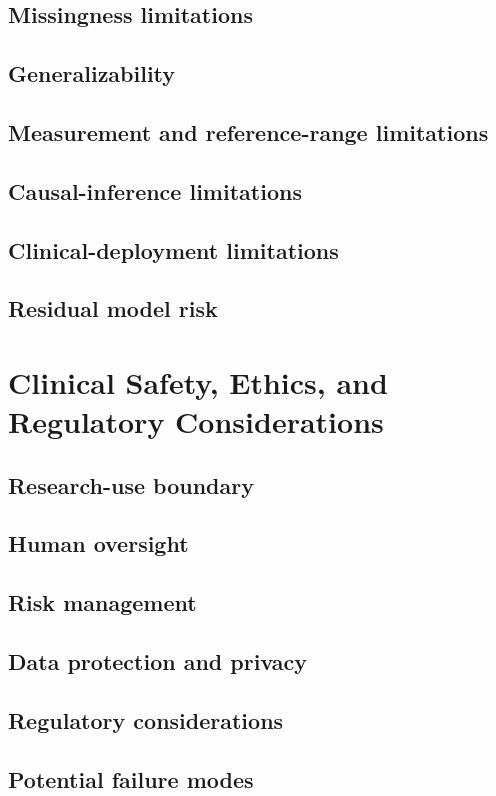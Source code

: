 \documentclass[10pt,journal]{IEEEtran}
\begin{document}
\subsection{Missingness limitations}
\subsection{Generalizability}
\subsection{Measurement and reference-range limitations}
\subsection{Causal-inference limitations}
\subsection{Clinical-deployment limitations}
\subsection{Residual model risk}

\section{Clinical Safety, Ethics, and Regulatory Considerations}
\subsection{Research-use boundary}
\subsection{Human oversight}
\subsection{Risk management}
\subsection{Data protection and privacy}
\subsection{Regulatory considerations}
\subsection{Potential failure modes}
\end{document}
